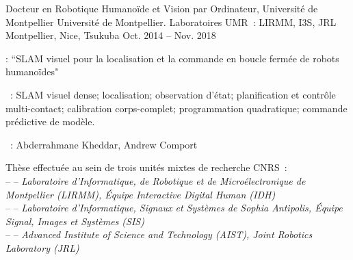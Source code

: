

\begin{cventries}

  \cventry
    {Docteur en Robotique Humanoïde et Vision par Ordinateur, Université de Montpellier} %
    {Université de Montpellier. Laboratoires UMR~: LIRMM, I3S, JRL} %
    {Montpellier, Nice, Tsukuba} %
    {Oct. 2014 -- Nov. 2018} %
    {
      \begin{cvitems} %
        \item {} : ``SLAM visuel pour la localisation et la commande en boucle fermée de robots humanoïdes"
        \item {}~: SLAM visuel dense; localisation; observation d'état; planification et contrôle multi-contact; calibration corps-complet; programmation quadratique; commande prédictive de modèle.
        \item {}~: Abderrahmane Kheddar, Andrew Comport 
        \item Thèse effectuée au sein de trois unités mixtes de recherche CNRS~:\\
        --  -- \emph{Laboratoire d'Informatique, de Robotique et de Microélectronique de Montpellier (LIRMM), Équipe Interactive Digital Human (IDH)}\\
          --  -- \emph{Laboratoire d'Informatique, Signaux et Systèmes de Sophia Antipolis, Équipe Signal, Images et Systèmes (SIS)}\\
          --  -- \emph{Advanced Institute of Science and Technology (AIST), Joint Robotics Laboratory (JRL)}
      \end{cvitems}
    }


\end{cventries}
